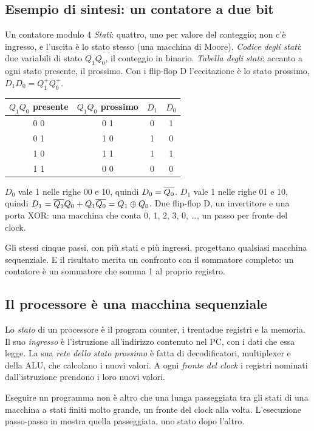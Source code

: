 \subsection{Esempio di sintesi: un contatore a due bit}

\begin{example}{Un contatore modulo 4}
\emph{Stati}: quattro, uno per valore del conteggio; non c'è ingresso, e
l'uscita è lo stato stesso (una macchina di Moore). \emph{Codice degli stati}:
due variabili di stato $Q_1Q_0$, il conteggio in binario. \emph{Tabella degli
stati}: accanto a ogni stato presente, il prossimo. Con i flip-flop D
l'eccitazione è lo stato prossimo, $D_1D_0=Q_1^{+}Q_0^{+}$.

\begin{center}\small\ttfamily
\begin{tabular}{c|c|cc}
\textrm{$Q_1Q_0$ presente}&\textrm{$Q_1Q_0$ prossimo}&\textrm{$D_1$}&\textrm{$D_0$}\\\hline
0 0&0 1&0&1\\0 1&1 0&1&0\\1 0&1 1&1&1\\1 1&0 0&0&0
\end{tabular}
\end{center}

$D_0$ vale 1 nelle righe 00 e 10, quindi $D_0=\overline{Q_0}$. $D_1$ vale 1 nelle
righe 01 e 10, quindi $D_1=\overline{Q_1}Q_0+Q_1\overline{Q_0}=Q_1\oplus Q_0$. Due
flip-flop D, un invertitore e una porta XOR: una macchina che conta 0, 1, 2, 3,
0, \ldots, un passo per fronte del clock.
\end{example}

Gli stessi cinque passi, con più stati e più ingressi, progettano qualsiasi
macchina sequenziale. E il risultato merita un confronto con il sommatore
completo: un contatore è un sommatore che somma 1 al proprio registro.

\subsection{Il processore è una macchina sequenziale}

\begin{prgmachine}
Lo \emph{stato} di un processore è il program counter, i trentadue registri e
la memoria. Il suo \emph{ingresso} è l'istruzione all'indirizzo contenuto nel
PC, con i dati che essa legge. La sua \emph{rete dello stato prossimo} è fatta
di decodificatori, multiplexer e della ALU, che calcolano i nuovi valori. A
ogni \emph{fronte del clock} i registri nominati dall'istruzione prendono i
loro nuovi valori.

Eseguire un programma non è altro che una lunga passeggiata tra gli stati di
una macchina a stati finiti molto grande, un fronte del clock alla volta.
L'esecuzione passo-passo in \prgqt mostra quella passeggiata, uno stato dopo
l'altro.
\end{prgmachine}

